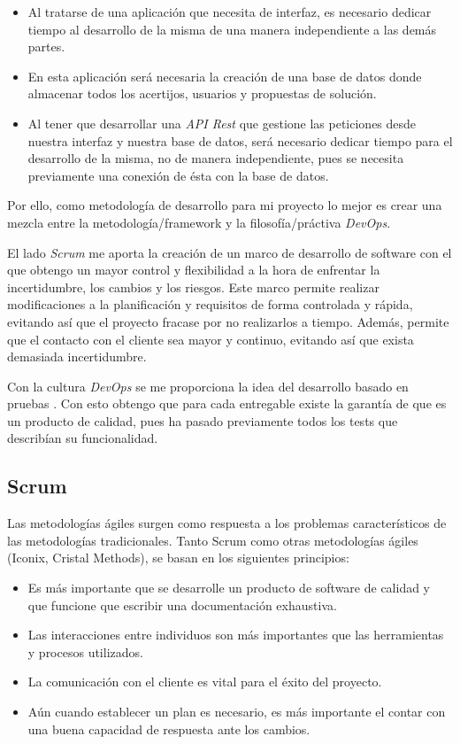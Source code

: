 \begin{itemize}
    \item Al tratarse de una aplicación que necesita de interfaz, es necesario dedicar tiempo al desarrollo de la misma de una manera independiente a las demás partes. 
    \item En esta aplicación será necesaria la creación de una base de datos donde almacenar todos los acertijos, usuarios y propuestas de solución.
    \item Al tener que desarrollar una \textit{API Rest} que gestione las peticiones desde nuestra interfaz y nuestra base de datos, será necesario dedicar tiempo para el desarrollo de la misma, no de manera independiente, pues se necesita previamente una conexión de ésta con la base de datos.
\end{itemize}

Por ello, como metodología de desarrollo para mi proyecto lo mejor es crear una mezcla entre la metodología/framework  y la filosofía/práctiva \textit{DevOps}.

El lado \textit{Scrum} me aporta la creación de un marco de desarrollo de software con el que obtengo un mayor control y flexibilidad a la hora de enfrentar la incertidumbre, los cambios y los riesgos. Este marco permite realizar modificaciones a la planificación y requisitos de forma controlada y rápida, evitando así que el proyecto fracase por no realizarlos a tiempo. Además, permite que el contacto con el cliente sea mayor y continuo, evitando así que exista demasiada incertidumbre.

Con la cultura \textit{DevOps} se me proporciona la idea del desarrollo basado en pruebas \cite{desarrollotests}\cite{desarrollotests2}. Con esto obtengo que para cada entregable existe la garantía de que es un producto de calidad, pues ha pasado previamente todos los tests que describían su funcionalidad.

\subsection{Scrum}

Las metodologías ágiles surgen como respuesta a los problemas característicos de las metodologías tradicionales. Tanto Scrum como otras metodologías ágiles (Iconix, Cristal Methods), se basan en los siguientes principios:

\begin{itemize}
    \item Es más importante que se desarrolle un producto de software de calidad y que funcione que escribir una documentación exhaustiva. 
    \item Las interacciones entre individuos son más importantes que las herramientas y procesos utilizados.
    \item La comunicación con el cliente es vital para el éxito del proyecto.
    \item Aún cuando establecer un plan es necesario, es más importante el contar con una buena capacidad de respuesta ante los cambios.
\end{itemize}

